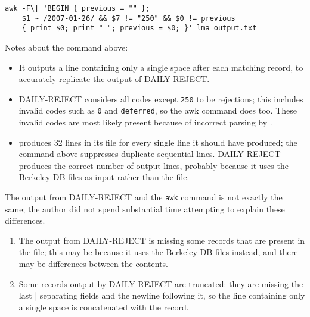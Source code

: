 
\begin{verbatim}
awk -F\| 'BEGIN { previous = "" };
    $1 ~ /2007-01-26/ && $7 != "250" && $0 != previous 
    { print $0; print " "; previous = $0; }' lma_output.txt
\end{verbatim}

Notes about the command above:

\begin{itemize}

    \item It outputs a line containing only a single space after each
        matching record, to accurately replicate the output of
        DAILY-REJECT\@.

    \item DAILY-REJECT considers all  codes except
        \texttt{250} to be rejections; this includes invalid 
        codes such as \texttt{0} and \texttt{deferred}, so the awk command
        does too.  These invalid  codes are most likely
        present because of incorrect parsing by .

    \item {} produces 32 lines in its  file for
        every single line it should have produced; the command above
        suppresses duplicate sequential lines.  DAILY-REJECT produces the
        correct number of output lines, probably because it uses the
        Berkeley DB files as input rather than the  file.

\end{itemize}

The output from DAILY-REJECT and the \texttt{awk} command is not exactly
the same; the author did not spend substantial time attempting to explain
these differences.

\begin{enumerate}

    \item The output from DAILY-REJECT is missing some records that are
        present in the  file; this may be because it uses the
        Berkeley DB files instead, and there may be differences between the
        contents.

    \item Some records output by DAILY-REJECT are truncated: they are
        missing the last | separating fields and the newline following it,
        so the line containing only a single space is concatenated with the
        record.

\end{enumerate}

